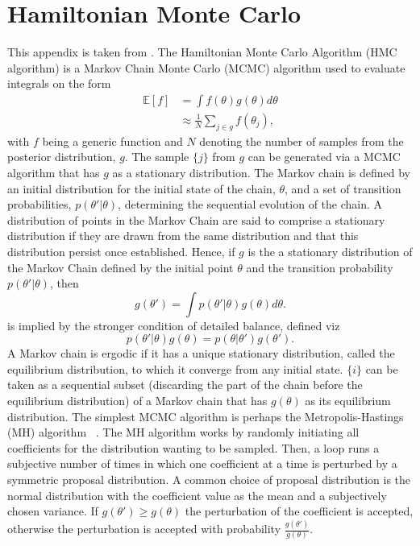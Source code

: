 \chapter{Hamiltonian Monte Carlo}
\label{app:HMC}
This appendix is taken from \citet{petersen2020}. The Hamiltonian Monte Carlo Algorithm (HMC algorithm) is a Markov Chain Monte Carlo (MCMC) algorithm used to evaluate integrals on the form
\begin{equation}
	\begin{split}
		\mathbb{E}[f] &= \int f(\theta)g(\theta)d\theta\\
		& \approx \frac{1}{N}\sum_{j\in g}f(\theta_j),
	\end{split}
\end{equation}
with $f$ being a generic function and $N$ denoting the number of samples from the posterior distribution, $g$. The sample $\{j\}$ from $g$ can be generated via a MCMC algorithm that has $g$ as a stationary distribution. The Markov chain is defined by an initial distribution for the initial state of the chain, $\theta$, and a set of transition probabilities, $p(\theta'|\theta)$, determining the sequential evolution of the chain. A distribution of points in the Markov Chain are said to comprise a stationary distribution if they are drawn from the same distribution and that this distribution persist once established. Hence, if $g$ is the a stationary distribution of the Markov Chain defined by the initial point $\theta$ and the transition probability $p(\theta'|\theta)$, then~\citep{Neal:1996}
\begin{equation}
	g(\theta')=\int p(\theta'|\theta)g(\theta)d\theta.
	\label{ee1}
\end{equation}
 is implied by the stronger condition of detailed balance, defined viz
\begin{equation}
	p(\theta'|\theta)g(\theta)=p(\theta|\theta')g(\theta').
\end{equation}
A Markov chain is ergodic if it has a unique stationary distribution, called the equilibrium distribution, to which it converge from any initial state. $\{i\}$ can be taken as a sequential subset (discarding the part of the chain before the equilibrium distribution) of a Markov chain that has $g(\theta)$ as its equilibrium distribution. \newline
The simplest MCMC algorithm is perhaps the Metropolis-Hastings (MH) algorithm ~\citep{Metropolis1953,hastings70}. The MH algorithm works by randomly initiating all coefficients for the distribution wanting to be sampled. Then, a loop runs a subjective number of times in which one coefficient at a time is perturbed by a symmetric proposal distribution. A common choice of proposal distribution is the normal distribution with the coefficient value as the mean and a subjectively chosen variance. If $g(\theta')\geq g(\theta)$ the perturbation of the coefficient is accepted, otherwise the perturbation is accepted with probability $\frac{g(\theta')}{g(\theta)}$.\newline
